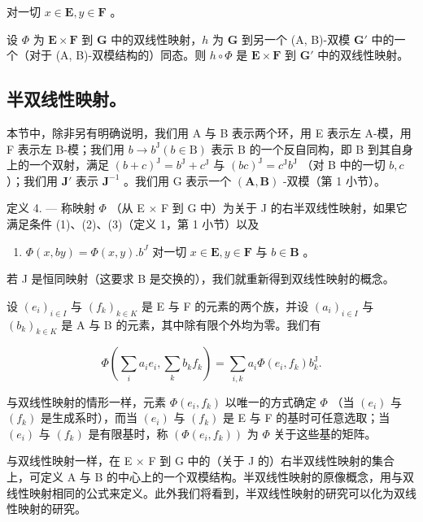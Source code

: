 对一切 \(x \in \mathbf{E}, y \in \mathbf{F}\) 。

设 \(\Phi\) 为 \(\mathbf{E} \times \mathbf{F}\) 到 \(\mathbf{G}\) 中的双线性映射，\(h\) 为 \(\mathbf{G}\) 到另一个 (A, B)-双模 \(\mathbf{G}'\) 中的一个（对于 (A, B)-双模结构的）同态。则 \(h \circ \Phi\) 是 \(\mathbf{E} \times \mathbf{F}\) 到 \(\mathbf{G}'\) 中的双线性映射。

\subsection{半双线性映射。}

本节中，除非另有明确说明，我们用 A 与 B 表示两个环，用 E 表示左 A-模，用 F 表示左 B-模；我们用 \(b \to b^{\mathrm{J}} (b \in \mathrm{B})\) 表示 B 的一个反自同构，即 B 到其自身上的一个双射，满足 \((b + c)^{\mathrm{J}} = b^{\mathrm{J}} + c^{\mathrm{J}}\) 与 \((bc)^{\mathrm{J}} = c^{\mathrm{J}}b^{\mathrm{J}}\) （对 B 中的一切 \(b, c\)）；我们用 \(\mathbf{J}'\) 表示 \(\mathbf{J}^{-1}\) 。我们用 G 表示一个 \((\mathbf{A}, \mathbf{B})\) -双模（第 1 小节）。

定义 4. --- 称映射 \(\Phi\) （从 E \(\times\) F 到 G 中）为关于 J 的右半双线性映射，如果它满足条件 (1)、(2)、(3)（定义 1，第 1 小节）以及

\begin{enumerate}
\def\labelenumi{(\arabic{enumi})}
\setcounter{enumi}{6}
\tightlist
\item
  \(\Phi(x, by) = \Phi(x, y). b^J\) 对一切 \(x \in \mathbf{E}, y \in \mathbf{F}\) 与 \(b \in \mathbf{B}\) 。
\end{enumerate}

若 J 是恒同映射（这要求 B 是交换的），我们就重新得到双线性映射的概念。

设 \((e_i)_{i\in I}\) 与 \((f_k)_{k\in K}\) 是 E 与 F 的元素的两个族，并设 \((a_i)_{i\in I}\) 与 \((b_k)_{k\in K}\) 是 A 与 B 的元素，其中除有限个外均为零。我们有

\[
\Phi (\sum_ {i} a _ {i} e _ {i}, \sum_ {k} b _ {k} f _ {k}) = \sum_ {i, k} a _ {i} \Phi (e _ {i}, f _ {k}) b _ {k} ^ {\mathrm{J}}.\tag{8}
\]

与双线性映射的情形一样，元素 \(\Phi(e_i, f_k)\) 以唯一的方式确定 \(\Phi\) （当 \((e_i)\) 与 \((f_k)\) 是生成系时），而当 \((e_i)\) 与 \((f_k)\) 是 E 与 F 的基时可任意选取；当 \((e_i)\) 与 \((f_k)\) 是有限基时，称 \((\Phi(e_i, f_k))\) 为 \(\Phi\) 关于这些基的矩阵。

与双线性映射一样，在 E × F 到 G 中的（关于 J 的）右半双线性映射的集合上，可定义 A 与 B 的中心上的一个双模结构。半双线性映射的原像概念，用与双线性映射相同的公式来定义。此外我们将看到，半双线性映射的研究可以化为双线性映射的研究。

